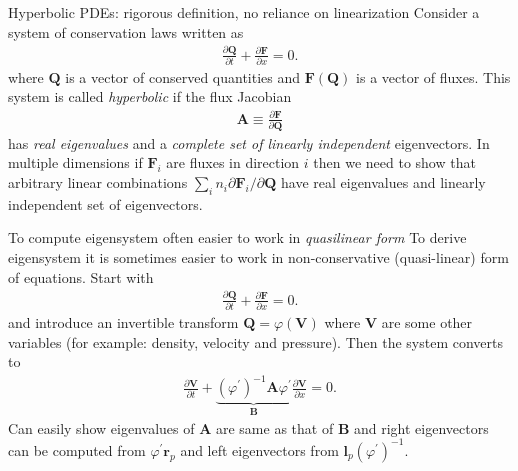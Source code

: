 \documentclass[aspectratio=169]{beamer}
\newcommand{\pfrac}[2]{\frac{\partial #1}{\partial #2}}
\newcommand{\mvec}[1]{\mathbf{#1}}
\begin{document}
\begin{frame}{Hyperbolic PDEs: rigorous definition, no reliance on
    linearization}
  Consider a system of conservation laws written as
  \begin{align*}
    \pfrac{\mvec{Q}}{t} + \pfrac{\mvec{F}}{x} = 0.
  \end{align*}
  where $\mvec{Q}$ is a vector of conserved quantities and
  $\mvec{F}(\mvec{Q})$ is a vector of fluxes. This system is called
  \emph{hyperbolic} if the flux Jacobian
  \begin{align*}
    \mvec{A} \equiv \pfrac{\mvec{F}}{\mvec{Q}}
  \end{align*}
  has \emph{real eigenvalues} and a \emph{complete set of linearly
    independent} eigenvectors. In multiple dimensions if $\mvec{F}_i$
  are fluxes in direction $i$ then we need to show that arbitrary
  linear combinations
  $\sum_i n_i {\partial\mvec{F}_i}/{\partial\mvec{Q}}$ have real
  eigenvalues and linearly independent set of eigenvectors.
  
\end{frame}

\begin{frame}{To compute eigensystem often easier to work in
    \emph{quasilinear form}}
  To derive eigensystem it is sometimes easier to work in
  non-conservative (quasi-linear) form of equations. Start with
  \begin{align*}
    \pfrac{\mvec{Q}}{t} + \pfrac{\mvec{F}}{x} = 0.
  \end{align*}
  and introduce an invertible transform $\mvec{Q} = \varphi(\mvec{V})$
  where $\mvec{V}$ are some other variables (for example: density,
  velocity and pressure). Then the system converts to
  \begin{align*}
    \pfrac{\mvec{V}}{t} +
    \underbrace{(\varphi^{\prime})^{-1} \mvec{A}\varphi^{\prime}}_{\mvec{B}}
    \pfrac{\mvec{V}}{x} = 0.
  \end{align*}
  Can easily show eigenvalues of $\mvec{A}$ are same as that of
  $\mvec{B}$ and right eigenvectors can be computed from
  $\varphi^{\prime} \mvec{r}_p$ and left eigenvectors from
  $\mvec{l}_p (\varphi^{\prime})^{-1}$.
\end{frame}
\end{document}

